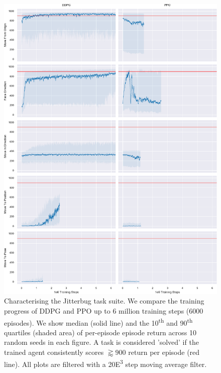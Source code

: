 \documentclass[letterpaper, 10 pt, conference]{ieeeconf}
\begin{document}
\begin{figure}[p]
    
    \centering
    \includegraphics[height=0.94\textheight]{fig-rl-perf}
    
    \caption{
        Characterising the Jitterbug task suite.
        We compare the training progress of DDPG and PPO up to 6 million training steps (6000 episodes).
        We show median (solid line) and the 10\textsuperscript{th} and 90\textsuperscript{th} quartiles (shaded area) of per-episode episode return across 10 random seeds in each figure.
        A task is considered 'solved' if the trained agent consistently scores $\gtrapprox 900$ return per episode (red line).
        All plots are filtered with a 20{\tiny E}\textsuperscript{3} step moving average filter.
    }
    
    \label{fig:rl-perf}
\end{figure}
\end{document}
